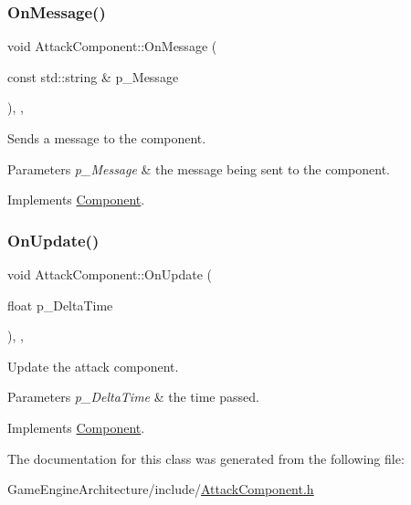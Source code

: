 \subsubsection{\texorpdfstring{OnMessage()}{OnMessage()}}
{\footnotesize\ttfamily void Attack\+Component\+::\+On\+Message (\begin{DoxyParamCaption}\item[{const std\+::string \&}]{p\+\_\+\+Message }\end{DoxyParamCaption})\hspace{0.3cm}{\ttfamily [inline]}, {\ttfamily [override]}, {\ttfamily [virtual]}}



Sends a message to the component. 


\begin{DoxyParams}{Parameters}
{\em p\+\_\+\+Message} & the message being sent to the component. \\
\hline
\end{DoxyParams}


Implements \mbox{\hyperlink{class_component_a1cd106256bf1791f9c6ab347776c7788}{Component}}.

\mbox{\label{class_attack_component_a92aca094d9d41cddca1a730e672cb835}} 
\subsubsection{\texorpdfstring{OnUpdate()}{OnUpdate()}}
{\footnotesize\ttfamily void Attack\+Component\+::\+On\+Update (\begin{DoxyParamCaption}\item[{float}]{p\+\_\+\+Delta\+Time }\end{DoxyParamCaption})\hspace{0.3cm}{\ttfamily [inline]}, {\ttfamily [override]}, {\ttfamily [virtual]}}



Update the attack component. 


\begin{DoxyParams}{Parameters}
{\em p\+\_\+\+Delta\+Time} & the time passed. \\
\hline
\end{DoxyParams}


Implements \mbox{\hyperlink{class_component_ac080e9fa054949464c796b65a4b26b93}{Component}}.



The documentation for this class was generated from the following file\+:\begin{DoxyCompactItemize}
\item 
Game\+Engine\+Architecture/include/\mbox{\hyperlink{_attack_component_8h}{Attack\+Component.\+h}}\end{DoxyCompactItemize}

